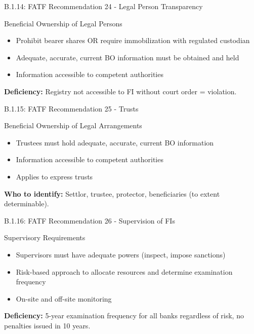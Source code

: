 \documentclass{beamer}
\begin{document}
	\begin{frame}{B.1.14: FATF Recommendation 24 - Legal Person Transparency}
		\begin{block}{Beneficial Ownership of Legal Persons}
			\begin{itemize}
				\item Prohibit bearer shares OR require immobilization with regulated custodian
				\item Adequate, accurate, current BO information must be obtained and held
				\item Information accessible to competent authorities
			\end{itemize}
		\end{block}
		\textbf{Deficiency:} Registry not accessible to FI without court order = violation.
	\end{frame}
	
	\begin{frame}{B.1.15: FATF Recommendation 25 - Trusts}
		\begin{block}{Beneficial Ownership of Legal Arrangements}
			\begin{itemize}
				\item Trustees must hold adequate, accurate, current BO information
				\item Information accessible to competent authorities
				\item Applies to express trusts
			\end{itemize}
		\end{block}
		\textbf{Who to identify:} Settlor, trustee, protector, beneficiaries (to extent determinable).
	\end{frame}
	
	\begin{frame}{B.1.16: FATF Recommendation 26 - Supervision of FIs}
		\begin{block}{Supervisory Requirements}
			\begin{itemize}
				\item Supervisors must have adequate powers (inspect, impose sanctions)
				\item Risk-based approach to allocate resources and determine examination frequency
				\item On-site and off-site monitoring
			\end{itemize}
		\end{block}
		\textbf{Deficiency:} 5-year examination frequency for all banks regardless of risk, no penalties issued in 10 years.
	\end{frame}
	
\end{document}

